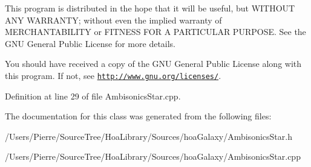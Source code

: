 This program is distributed in the hope that it will be useful, but W\-I\-T\-H\-O\-U\-T A\-N\-Y W\-A\-R\-R\-A\-N\-T\-Y; without even the implied warranty of M\-E\-R\-C\-H\-A\-N\-T\-A\-B\-I\-L\-I\-T\-Y or F\-I\-T\-N\-E\-S\-S F\-O\-R A P\-A\-R\-T\-I\-C\-U\-L\-A\-R P\-U\-R\-P\-O\-S\-E. See the G\-N\-U General Public License for more details.

You should have received a copy of the G\-N\-U General Public License along with this program. If not, see \href{http://www.gnu.org/licenses/}{\tt http\-://www.\-gnu.\-org/licenses/}. 

Definition at line 29 of file Ambisonics\-Star.\-cpp.



The documentation for this class was generated from the following files\-:\begin{DoxyCompactItemize}
\item 
/\-Users/\-Pierre/\-Source\-Tree/\-Hoa\-Library/\-Sources/hoa\-Galaxy/Ambisonics\-Star.\-h\item 
/\-Users/\-Pierre/\-Source\-Tree/\-Hoa\-Library/\-Sources/hoa\-Galaxy/Ambisonics\-Star.\-cpp\end{DoxyCompactItemize}
